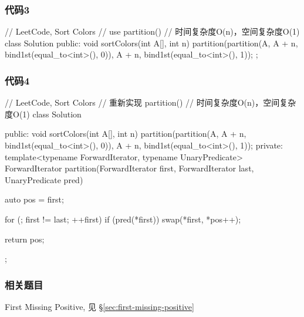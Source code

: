 \subsubsection{代码3}
\begin{Code}
	// LeetCode, Sort Colors
	// use partition()
	// 时间复杂度O(n)，空间复杂度O(1)
	class Solution {
		public:
		void sortColors(int A[], int n) {
			partition(partition(A, A + n, bind1st(equal_to<int>(), 0)), A + n,
			bind1st(equal_to<int>(), 1));
		}
	};
\end{Code}


\subsubsection{代码4}
\begin{Code}
	// LeetCode, Sort Colors
	// 重新实现 partition()
	// 时间复杂度O(n)，空间复杂度O(1)
	class Solution {
		public:
		void sortColors(int A[], int n) {
			partition(partition(A, A + n, bind1st(equal_to<int>(), 0)), A + n,
			bind1st(equal_to<int>(), 1));
		}
		private:
		template<typename ForwardIterator, typename UnaryPredicate>
		ForwardIterator partition(ForwardIterator first, ForwardIterator last,
		UnaryPredicate pred) {
			auto pos = first;
			
			for (; first != last; ++first)
			if (pred(*first))
			swap(*first, *pos++);
			
			return pos;
		}
	};
\end{Code}


\subsubsection{相关题目}
\begindot
\item First Missing Positive, 见 \S \ref{sec:first-missing-positive}
\myenddot
